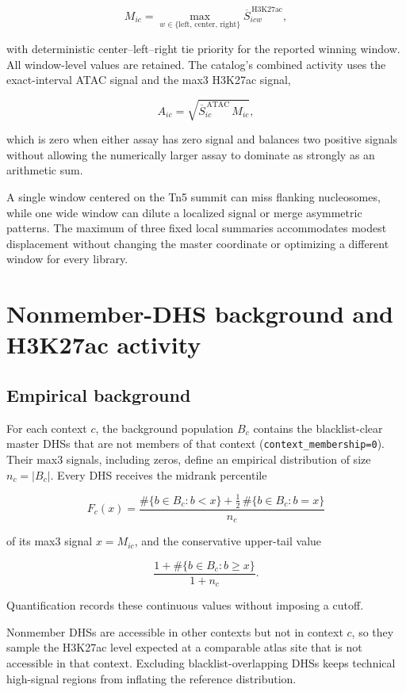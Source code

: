 \documentclass[11pt]{article}
\begin{document}
\[
  M_{ic}=\max_{w\in\{\mathrm{left},\,\mathrm{center},\,\mathrm{right}\}}
  \overline{S}^{\,\mathrm{H3K27ac}}_{icw},
\]

with deterministic center--left--right tie priority for the reported winning
window.  All window-level values are retained.  The catalog's combined
activity uses the exact-interval ATAC signal and the max3 H3K27ac signal,

\[
  A_{ic}=\sqrt{\overline{S}^{\,\mathrm{ATAC}}_{ic}\,M_{ic}},
\]

which is zero when either assay has zero signal and balances two positive
signals without allowing the numerically larger assay to dominate as strongly
as an arithmetic sum.

A single window centered on the Tn5 summit can miss flanking nucleosomes, while
one wide window can dilute a localized signal or merge asymmetric patterns.
The maximum of three fixed local summaries accommodates modest displacement
without changing the master coordinate or optimizing a different window for
every library.

\section{Nonmember-DHS background and H3K27ac activity}
\label{sec:activity}

\subsection{Empirical background}

For each context \(c\), the background population \(B_c\) contains the
blacklist-clear master DHSs that are not members of that context
(\texttt{context\_membership=0}).  Their max3 signals, including zeros, define an empirical
distribution of size \(n_c=|B_c|\).  Every DHS receives the midrank percentile

\[
  F_{c}(x)=\frac{\#\{b\in B_c: b<x\}+\tfrac12\,\#\{b\in B_c: b=x\}}{n_c}
\]

of its max3 signal \(x=M_{ic}\), and the conservative upper-tail value

\[
  \frac{1 + \#\{b\in B_c: b\geq x\}}{1+n_c}.
\]

Quantification records these continuous values without imposing a cutoff.

Nonmember DHSs are accessible in other contexts but not in context \(c\), so
they sample the H3K27ac level expected at a comparable atlas site that is not
accessible in that context.  Excluding blacklist-overlapping DHSs keeps
technical high-signal regions from inflating the reference distribution.
\end{document}
